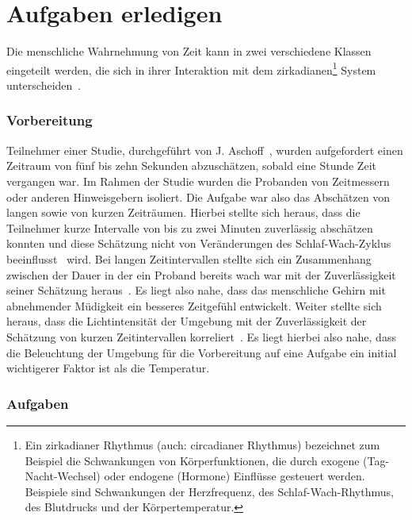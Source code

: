 \section{Aufgaben erledigen}\label{sec:relatedWork.aufgaben}

Die menschliche Wahrnehmung von Zeit kann in zwei verschiedene Klassen eingeteilt werden, die sich in ihrer Interaktion mit dem zirkadianen\footnote{Ein zirkadianer Rhythmus (auch: circadianer Rhythmus) bezeichnet zum Beispiel die Schwankungen von Körperfunktionen, die durch exogene (Tag-Nacht-Wechsel) oder endogene (Hormone) Einflüsse gesteuert werden. Beispiele sind Schwankungen der Herzfrequenz, des Schlaf-Wach-Rhythmus, des Blutdrucks und der Körpertemperatur.} System unterscheiden~\cite{aschoff1998human, aschoff1985perception}.

\subsubsection{Vorbereitung}

Teilnehmer einer Studie, durchgeführt von J. Aschoff~\cite{aschoff1998human}, wurden aufgefordert einen Zeitraum von fünf bis zehn Sekunden abzuschätzen, sobald eine Stunde Zeit vergangen war. Im Rahmen der Studie wurden die Probanden von Zeitmessern oder anderen Hinweisgebern isoliert.
Die Aufgabe war also das Abschätzen von langen sowie von kurzen Zeiträumen. 
Hierbei stellte sich heraus, dass die Teilnehmer kurze Intervalle von bis zu zwei Minuten zuverlässig abschätzen konnten und diese Schätzung nicht von Veränderungen des Schlaf-Wach-Zyklus beeinflusst~\cite{aschoff1998human} wird. 
Bei langen Zeitintervallen stellte sich ein Zusammenhang zwischen der Dauer in der ein Proband bereits wach war mit der Zuverlässigkeit seiner Schätzung heraus~\cite{aschoff1998human}. 
Es liegt also nahe, dass das menschliche Gehirn mit abnehmender Müdigkeit ein besseres Zeitgefühl entwickelt.
Weiter stellte sich heraus, dass die Lichtintensität der Umgebung mit der Zuverlässigkeit der Schätzung von kurzen Zeitintervallen korreliert~\cite{aschoff1998human}.
Es liegt hierbei also nahe, dass die Beleuchtung der Umgebung für die Vorbereitung auf eine Aufgabe ein initial wichtigerer Faktor ist als die Temperatur. 

\subsubsection{Aufgaben}

